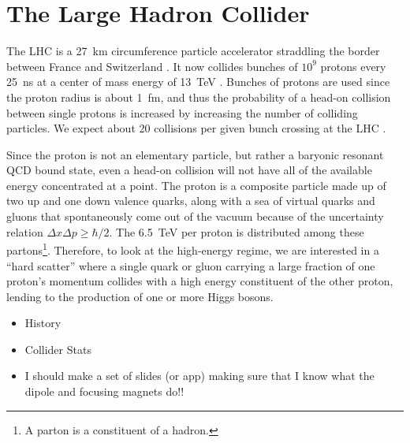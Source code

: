 \chapter{The Large Hadron Collider}
\label{ch:lhc}


The LHC is a 27~km circumference particle accelerator straddling the border between France and Switzerland \cite{LHC}. It now collides bunches of $10^9$ protons every 25~ns at a center of mass energy of 13~TeV \cite{ATLAS_long}.
Bunches of protons are used since the proton radius is about 1~fm, and thus the probability of a head-on collision between single protons is increased by increasing the number of colliding particles.  We expect about 20 collisions per given bunch crossing at the LHC \cite{PU}.

Since the proton is not an elementary particle, but rather a baryonic resonant QCD bound state, even a head-on collision will not have all of the available energy concentrated at a point.
The proton is a composite particle made up of two up and one down valence quarks, along with a sea of virtual quarks and gluons that spontaneously come out of the vacuum because of the uncertainty relation $\Delta x \Delta p \geq \hbar / 2$.  
The 6.5~TeV per proton is distributed among these partons\footnote[3]{A parton is a constituent of a hadron.}.  Therefore, to look at the high-energy regime, we are interested in a ``hard scatter'' where a single quark or gluon carrying a large fraction of one proton's momentum collides with a high energy constituent of the other proton, lending to the production of one or more Higgs bosons.

\begin{itemize}
	\item History
	\item Collider Stats
	\item I should make a set of slides (or app) making sure that I know what the dipole and focusing magnets do!!
\end{itemize}